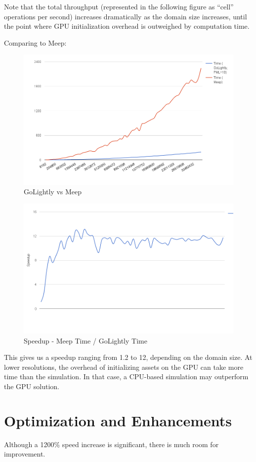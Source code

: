Note that the total throughput (represented in the following figure as “cell” operations per second) increases dramatically as the domain size increases, until the point where GPU initialization overhead is outweighed by computation time.

Comparing to Meep:

\begin{figure}[H]
	\centering
	\includegraphics[width=\textwidth,
	keepaspectratio]{gpu-vs-meep.png}
	\caption{GoLightly vs Meep}
	\label{fig:gpuVsMeep}
\end{figure}

\begin{figure}[H]
	\centering
	\includegraphics[width=\textwidth,
	keepaspectratio]{gpu-vs-meep-speedup.png}
	\caption{Speedup - Meep Time / GoLightly Time}
	\label{fig:gpuVsMeepSpeedup}
\end{figure}

This gives us a speedup ranging from 1.2 to 12, depending on the domain size. At lower resolutions, the overhead of initializing assets on the GPU can take more time than the simulation. In that case, a CPU-based simulation may outperform the GPU solution.

\section{Optimization and Enhancements}
Although a 1200\% speed increase is significant, there is much room for improvement. 





